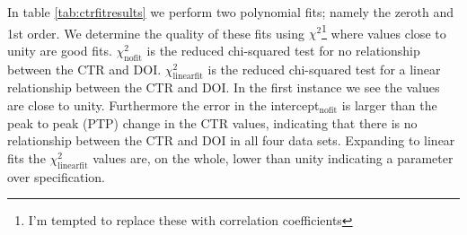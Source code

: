 In table \ref{tab:ctrfitresults} we perform two polynomial fits; namely the zeroth and 1st order. We determine the quality of these fits using $\chi^2$\footnote{I'm tempted to replace these with correlation coefficients} where values close to unity are good fits. $\chi^2_\text{nofit}$ is the reduced chi-squared test for no relationship between the CTR and DOI. $\chi^2_\text{linearfit}$ is the reduced chi-squared test for a linear relationship between the CTR and DOI. In the first instance we see the values are close to unity. Furthermore the error in the intercept$_\text{nofit}$ is larger than the peak to peak (PTP) change in the CTR values, indicating that there is no relationship between the CTR and DOI in all four data sets. Expanding to linear fits the $\chi^2_\text{linearfit}$ values are, on the whole, lower than unity indicating a parameter over specification.